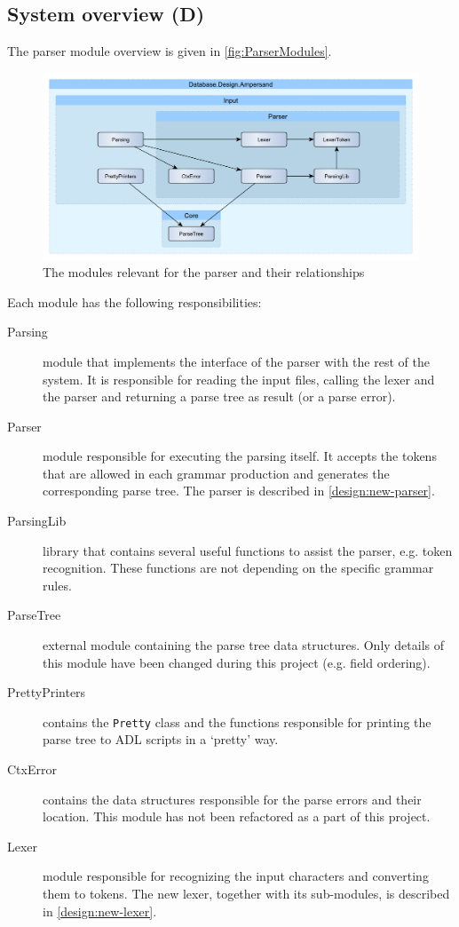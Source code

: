 
\subsection{System overview (D)}
  The parser module overview is given in \autoref{fig:ParserModules}.
  \begin{figure}[ht]%
    \includegraphics[width=\columnwidth]{Figures/ParserModules}
    \caption{The modules relevant for the parser and their relationships}
    \label{fig:ParserModules}
  \end{figure}%
  Each module has the following responsibilities:
  \begin{description}
    \item[Parsing] module that implements the interface of the parser with the rest of the system.
      It is responsible for reading the input files, calling the lexer and the parser and returning a parse tree as result (or a parse error).

    \item[Parser] module responsible for executing the parsing itself.
      It accepts the tokens that are allowed in each grammar production and generates the corresponding parse tree.
      The parser is described in \autoref{design:new-parser}.
      
    \item[ParsingLib] library that contains several useful functions to assist the parser, e.g. token recognition.
      These functions are not depending on the specific grammar rules.
      
    \item[ParseTree] external module containing the parse tree data structures.
      Only details of this module have been changed during this project (e.g. field ordering).
    
    \item[PrettyPrinters] contains the \texttt{Pretty} class and the functions responsible for printing the parse tree to ADL scripts in a `pretty' way.
    
    \item[CtxError] contains the data structures responsible for the parse errors and their location.
      This module has not been refactored as a part of this project.
    
    \item[Lexer] module responsible for recognizing the input characters and converting them to tokens.
      The new lexer, together with its sub-modules, is described in \autoref{design:new-lexer}.
  \end{description}
